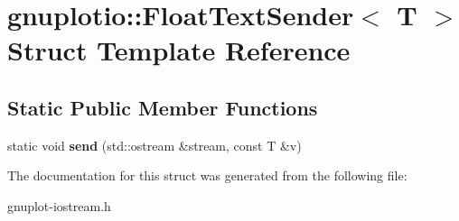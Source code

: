\hypertarget{structgnuplotio_1_1FloatTextSender}{}\section{gnuplotio\+:\+:Float\+Text\+Sender$<$ T $>$ Struct Template Reference}
\label{structgnuplotio_1_1FloatTextSender}
\subsection*{Static Public Member Functions}
\begin{DoxyCompactItemize}
\item 
\mbox{\label{structgnuplotio_1_1FloatTextSender_aed6b6c3a95b1396688800d6d1f2fc299}} 
static void {\bfseries send} (std\+::ostream \&stream, const T \&v)
\end{DoxyCompactItemize}


The documentation for this struct was generated from the following file\+:\begin{DoxyCompactItemize}
\item 
gnuplot-\/iostream.\+h\end{DoxyCompactItemize}
